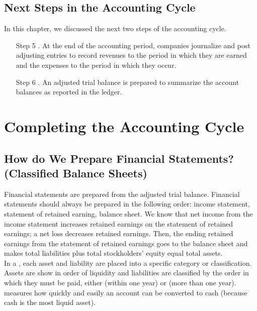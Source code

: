\documentclass{article}
\begin{document}
\subsection{Next Steps in the Accounting Cycle}

In this chapter, we discussed the next two steps of the accounting cycle. 
\begin{itemize}
  \item[Step 5] . At the end of the accounting period, companies journalize and post adjusting entries to record revenues to the period in which they are earned and the expenses to the period in which they occur. 
  \item[Step 6] . An adjusted trial balance is prepared to summarize the account balances as reported in the ledger. 
\end{itemize}

\section{Completing the Accounting Cycle}

\subsection{How do We Prepare Financial Statements? (Classified Balance Sheets)}

Financial statements are prepared from the adjusted trial balance. Financial statements should always be prepared in the following order: income statement, statement of retained earning, balance sheet. We know that net income from the income statement increases retained earnings on the statement of retained earnings; a net loss decreases retained earnings. Then, the ending retained earnings from the statement of retained earnings goes to the balance sheet and makes total liabilities plus total stockholders' equity equal total assets. \\ 

In a , each asset and liability are placed into a specific category or classification. Assets are show in order of liquidity and liabilities are classified by the order in which they must be paid, either  (within one year) or  (more than one year).  measures how quickly and easily an account can be converted to cash (because cash is the most liquid asset). \\ 
\end{document}
